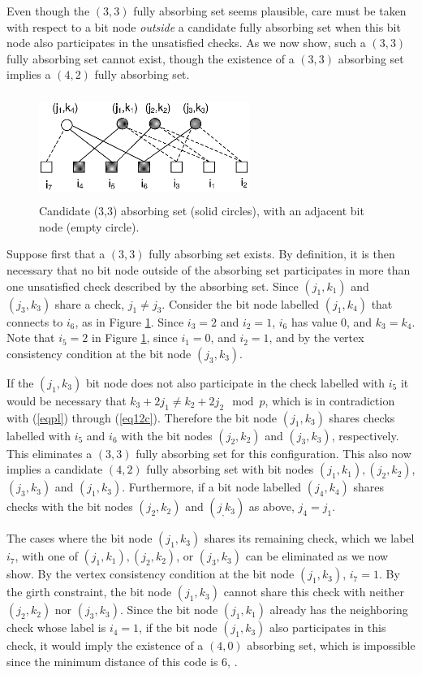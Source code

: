 Even though the $(3,3)$ fully absorbing set seems plausible, care
must be taken with respect to a bit node \emph{outside} a
candidate fully absorbing set when this bit node also participates
in the unsatisfied checks. As we now show, such a $(3,3)$ fully
absorbing set cannot exist, though the existence of a $(3,3)$
absorbing set implies  a $(4,2)$ fully absorbing set.

\begin{figure}
\center\includegraphics[width=2.7in,height=1.35in]{fig05c.eps}
\caption{Candidate (3,3) absorbing set (solid circles), with an
adjacent bit node (empty circle).}\label{Fig05a}
\end{figure}

Suppose first that a $(3,3)$ fully absorbing set exists. By
definition, it is then necessary that no bit node outside of the
absorbing set participates in more than one unsatisfied check
described by the absorbing set. Since $(j_1,k_1)$ and $(j_3,k_3)$
share a check, $j_1 \neq j_3$. Consider the bit node labelled
$(j_1,k_4)$ that connects to $i_6$, as in Figure \ref{Fig05a}.
Since $i_3=2$ and $i_2=1$, $i_6$ has value 0, and $k_3=k_4$. Note
that $i_5=2$ in Figure \ref{Fig05a}, since $i_1=0$, and $i_2=1$,
and by the vertex consistency condition at the bit node
$(j_3,k_3)$.

If the $(j_1,k_3)$ bit node does not also participate in the check
labelled with $i_5$ it would be necessary that $k_3+2j_1 \neq
k_2+2j_2 \mod p$, which is in contradiction with (\ref{eqpl})
through (\ref{eq12c}). Therefore the bit node $(j_1,k_3)$ shares
checks labelled with $i_5$ and $i_6$ with the bit nodes
$(j_2,k_2)$ and  $(j_3,k_3)$, respectively. This eliminates a
$(3,3)$ fully absorbing set for this configuration. This also now
implies a candidate $(4,2)$ fully absorbing set with bit nodes
$(j_1,k_1), (j_2,k_2)$, $(j_3,k_3)$ and $(j_1,k_3)$. Furthermore,
if a bit node labelled $(j_4,k_4)$ shares checks with the bit
nodes $(j_2,k_2)$ and $(j_,k_3)$ as above, $j_4=j_1$.

The cases where the bit node $(j_1,k_3)$ shares its remaining
check, which we label $i_7$, with one of $(j_1,k_1), (j_2,k_2)$,
or $(j_3,k_3)$ can be eliminated as we now show. By the vertex
consistency condition at the bit node $(j_1,k_3)$, $i_7=1$. By the
girth constraint, the bit node $(j_1,k_3)$ cannot share this check
with neither $(j_2,k_2)$ nor $(j_3,k_3)$. Since the bit node
$(j_1,k_1)$ already has the neighboring check whose label is
$i_4=1$, if the bit node $(j_1,k_3)$ also participates in this
check, it would imply the existence of a $(4,0)$ absorbing set,
which is impossible since the minimum distance of this code is 6,
\cite{helles}.


